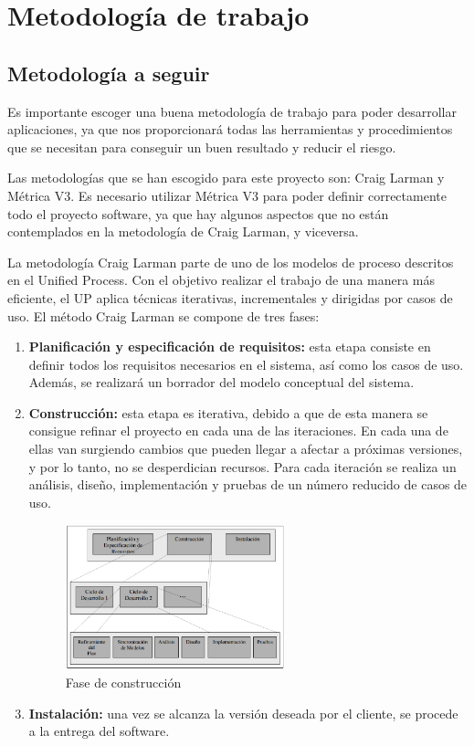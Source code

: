 


\section{Metodología de trabajo}
\subsection {Metodología a seguir}
\par Es importante escoger una buena metodología de trabajo para poder desarrollar aplicaciones, ya que nos proporcionará todas las herramientas y procedimientos que se necesitan para conseguir un buen resultado y reducir el riesgo.
\par Las metodologías que se han escogido para este proyecto son: Craig Larman y Métrica V3. Es necesario utilizar Métrica V3 para poder definir correctamente todo el proyecto software, ya que hay algunos aspectos que no están contemplados en la metodología de Craig Larman, y viceversa.
\par La metodología Craig Larman parte de uno de los modelos de proceso descritos en el Unified Process. Con el objetivo realizar el trabajo de una manera más eficiente, el UP aplica técnicas iterativas, incrementales y dirigidas por casos de uso. El método Craig Larman se compone de tres fases:
\begin{enumerate}[1.]
\item \textbf{Planificación y especificación de requisitos:} esta etapa consiste en definir todos los requisitos necesarios en el sistema, así como los casos de uso. Además, se realizará un borrador del modelo conceptual del sistema.
\item \textbf{Construcción:} esta etapa es iterativa, debido a que de esta manera se consigue refinar el proyecto en cada una de las iteraciones. En cada una de ellas van surgiendo cambios que pueden llegar a afectar a próximas versiones, y por lo tanto, no se desperdician recursos. Para cada iteración se realiza un análisis, diseño, implementación y pruebas de un número reducido de casos de uso.
\begin{figure}[H]
\begin{center}
\includegraphics[width=0.6\textwidth]{./img/Metodologia.png}
\end{center}
\caption{Fase de construcción}
\label{tab:horasTotales}
\end{figure}


\item \textbf{Instalación:} una vez se alcanza la versión deseada por el cliente, se procede a la entrega del software.
\end{enumerate}
